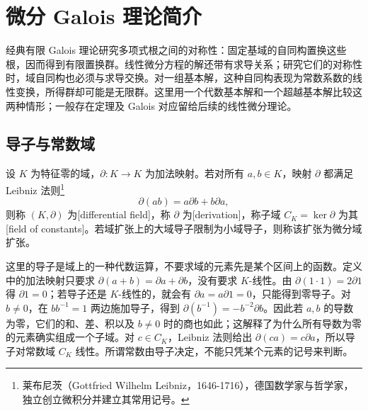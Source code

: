 
\section{微分 Galois 理论简介}
\label{b1:sec:D03}

经典有限 Galois 理论研究多项式根之间的对称性：固定基域的自同构置换这些根，因而得到有限置换群。线性微分方程的解还带有求导关系；研究它们的对称性时，域自同构也必须与求导交换。对一组基本解，这种自同构表现为常数系数的线性变换，所得群却可能是无限群。这里用一个代数基本解和一个超越基本解比较这两种情形；一般存在定理及 Galois 对应留给后续的线性微分理论。

\subsection{导子与常数域}
\label{b1:subsec:D03:01}

\begin{definition}\label{b1:def:differential-field}
	设 \(K\) 为特征零的域，\(\partial:K\rightarrow K\) 为加法映射。若对所有 \(a,b\in K\)，映射 \(\partial\) 都满足 Leibniz 法则\footnote{莱布尼茨（Gottfried Wilhelm Leibniz，1646-1716），德国数学家与哲学家，独立创立微积分并建立其常用记号。}
	\[
		\partial(ab)=a\partial b+b\partial a,
	\]
	则称 \((K,\partial)\) 为[differential field]，称 \(\partial\) 为[derivation]，称子域 \(C_K=\ker\partial\) 为其[field of constants]。若域扩张上的大域导子限制为小域导子，则称该扩张为微分域扩张。
\end{definition}

这里的导子是域上的一种代数运算，不要求域的元素先是某个区间上的函数。定义中的加法映射只要求 \(\partial(a+b)=\partial a+\partial b\)，没有要求 \(K\)-线性。由 \(\partial(1\cdot1)=2\partial1\) 得 \(\partial1=0\)；若导子还是 \(K\)-线性的，就会有 \(\partial a=a\partial1=0\)，只能得到零导子。对 \(b\neq0\)，在 \(bb^{-1}=1\) 两边施加导子，得到 \(\partial(b^{-1})=-b^{-2}\partial b\)。因此若 \(a,b\) 的导数为零，它们的和、差、积以及 \(b\neq0\) 时的商也如此；这解释了为什么所有导数为零的元素确实组成一个子域。对 \(c\in C_K\)，Leibniz 法则给出 \(\partial(ca)=c\partial a\)，所以导子对常数域 \(C_K\) 线性。所谓常数由导子决定，不能只凭某个元素的记号来判断。

